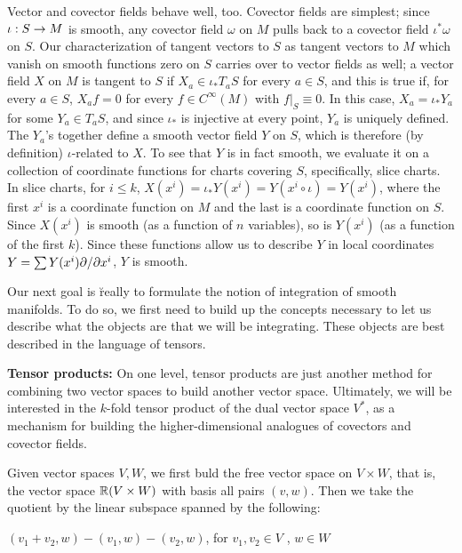 Vector and covector fields behave well, too. Covector fields are simplest;
since $\iota:S\rightarrow M$ is smooth, any covector field $\omega$ on $M$ pulls back to a 
covector field $\iota^*\omega$ on $S$. Our characterization of tangent vectors to
$S$ as tangent vectors to $M$ which vanish on smooth functions zero on $S$ 
carries over to vector fields as well; a vector field $X$ on $M$ is tangent to
$S$ if $X_a\in \iota_*T_aS$ for every $a\in S$, and this is true if, for every 
$a\in S$, $X_af=0$ for every $f\in C^\infty(M)$ with $f|_S\equiv 0$. In this 
case, $X_a=\iota_*Y_a$ for some $Y_a\in T_aS$, and since $\iota_*$ is injective at 
every point, $Y_a$ is uniquely defined. The $Y_a$'s together define a
smooth vector field $Y$ on $S$, which is therefore (by definition) $\iota$-related to
$X$. To see that $Y$ is in fact smooth, we evaluate it on a collection of coordinate
functions for charts covering $S$, specifically, slice charts. In slice charts, for $i\leq k$,
$X(x^i)=\iota_*Y(x^i)=Y(x^i\circ\iota)=Y(x^i)$, where the first $x^i$ is a coordinate function on
$M$ and the last is a coordinate function on $S$. Since $X(x^i)$ is smooth (as a function of
$n$ variables), so is $Y(x^i)$ (as a function of the first $k$). Since these functions
allow us to describe $Y$ in local coordinates $Y=\sum Y(x^i) \partial/\partial x^i$, $Y$ is smooth.

\msk

Our next goal is \u{really} to formulate the notion
of integration of smooth manifolds. To do so, we first need to build up the
concepts necessary to let us describe what the objects are that we will
be integrating. These objects are best described in the language of tensors.

\bsk

{\bf Tensor products:} On one level, tensor products are just another method for combining two vector spaces
to build another vector space. Ultimately, we will be interested in the $k$-fold tensor product
of the dual vector space $V^*$, as a mechanism for building the higher-dimensional analogues of
covectors and covector fields.

\msk

Given vector spaces $V,W$, we first buld the free vector space
on $V\times W$, that is, the vector space ${\Bbb R}(V\times W)$
with basis all pairs
$(v,w)$. Then we take the quotient by the linear subspace spanned
by the following:

\ssk

$(v_1+v_2,w)-(v_1,w)-(v_2,w)$, for $v_1,v_2\in V$ , $w\in W$

